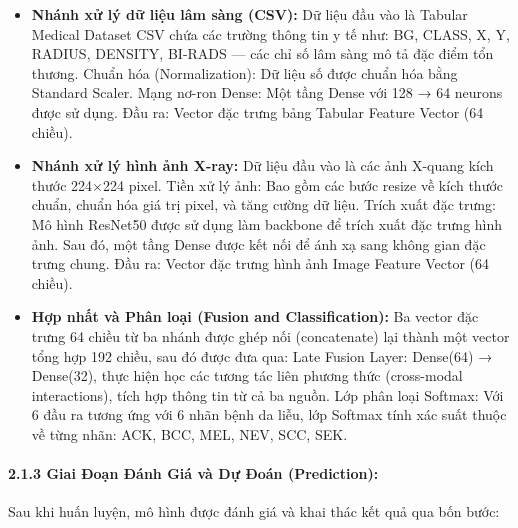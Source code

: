     \begin{itemize}
    \item \textbf{Nhánh xử lý dữ liệu lâm sàng (CSV):} Dữ liệu đầu vào là Tabular Medical Dataset CSV chứa các trường thông tin y tế như: BG, CLASS, X, Y, RADIUS, DENSITY, BI-RADS — các chỉ số lâm sàng mô tả đặc điểm tổn thương. Chuẩn hóa (Normalization): Dữ liệu số được chuẩn hóa bằng Standard Scaler. Mạng nơ-ron Dense: Một tầng Dense với 128 → 64 neurons được sử dụng. Đầu ra: Vector đặc trưng bảng Tabular Feature Vector (64 chiều).

    
    \item \textbf{Nhánh xử lý hình ảnh X-ray:  } Dữ liệu đầu vào là các ảnh X-quang kích thước 224×224 pixel. Tiền xử lý ảnh: Bao gồm các bước resize về kích thước chuẩn, chuẩn hóa giá trị pixel, và tăng cường dữ liệu. Trích xuất đặc trưng: Mô hình ResNet50 được sử dụng làm backbone để trích xuất đặc trưng hình ảnh. Sau đó, một tầng Dense được kết nối để ánh xạ sang không gian đặc trưng chung. Đầu ra: Vector đặc trưng hình ảnh Image Feature Vector (64 chiều).


    \item \textbf{Hợp nhất và Phân loại (Fusion and Classification): } Ba vector đặc trưng 64 chiều từ ba nhánh được ghép nối (concatenate) lại thành một vector tổng hợp 192 chiều, sau đó được đưa qua: Late Fusion Layer: Dense(64) → Dense(32), thực hiện học các tương tác liên phương thức (cross-modal interactions), tích hợp thông tin từ cả ba nguồn. Lớp phân loại Softmax: Với 6 đầu ra tương ứng với 6 nhãn bệnh da liễu, lớp Softmax tính xác suất thuộc về từng nhãn: ACK, BCC, MEL, NEV, SCC, SEK.


\end{itemize}

     \paragraph{2.1.3 Giai Đoạn Đánh Giá và Dự Đoán (Prediction):}
     Sau khi huấn luyện, mô hình được đánh giá và khai thác kết quả qua bốn bước:


